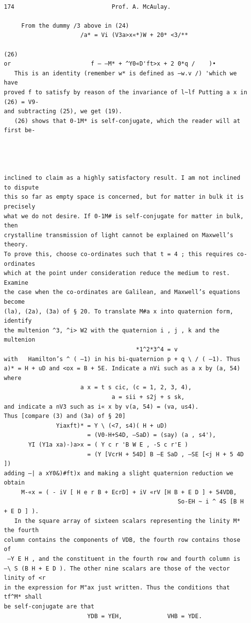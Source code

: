 \documentclass[10pt]{article}
\begin{document}
\clearpage
\begin{verbatim}

174                            Prof. A. McAulay.

     From the dummy /3 above in (24)
                      /a* = Vi (V3a>x«*)W + 20* <3/**
                                                                              (26)
or                       f — —M* + ^Y0«D'ft>x + 2 0*q /    )•
   This is an identity (remember w* is defined as —w.v /) 'which we have
proved f to satisfy by reason of the invariance of l~lf Putting a x in (26) = V9-
and subtracting (25), we get (19).
   (26) shows that 0-1M* is self-conjugate, which the reader will at first be-




inclined to claim as a highly satisfactory result. I am not inclined to dispute
this so far as empty space is concerned, but for matter in bulk it is precisely
what we do not desire. If 0-1M# is self-conjugate for matter in bulk, then
crystalline transmission of light cannot be explained on Maxwell’s theory.
To prove this, choose co-ordinates such that t = 4 ; this requires co-ordinates
which at the point under consideration reduce the medium to rest. Examine
the case when the co-ordinates are Galilean, and Maxwell’s equations become
(la), (2a), (3a) of § 20. To translate M#a x into quaternion form, identify
the multenion ^3, ^i> W2 with the quaternion i , j , k and the multenion
                                      *1^2*3^4 = v
with   Hamilton’s ^ ( —1) in his bi-quaternion p + q \ / ( —1). Thus
a)* = H + uD and <ox = B + 5E. Indicate a nVi such as a x by (a, 54) where
                      a x = t s cic, (c = 1, 2, 3, 4),
                               a = sii + s2j + s sk,
and indicate a nV3 such as i« x by v(a, 54) = (va, us4).
Thus [compare (3) and (3a) of § 20]
               Yiaxft)* = Y \ (<7, s4)( H + uD)
                        = (V0-H+S4D, —SaD) = (say) (a , s4'),
       YI (Y1a xa)-)a>x = ( Y c r 'B W E , -S c r'E )
                        = (Y [VcrH + 54D] B —E SaD , —SE [<j H + 5 4D ])
adding —| a xY0&)#ft)x and making a slight quaternion reduction we obtain
     M-«x = ( - iV [ H e r B + EcrD] + iV «rV [H B + E D ] + 54VDB,
                                                  So-EH ~ i ^ 4S [B H + E D ] ).
   In the square array of sixteen scalars representing the linity M* the fourth
column contains the components of VDB, the fourth row contains those of
 —Y E H , and the constituent in the fourth row and fourth column is
—\ S (B H + E D ). The other nine scalars are those of the vector linity of <r
in the expression for M"ax just written. Thus the conditions that tf^M* shall
be self-conjugate are that
                        YDB = YEH,             VHB = YDE.


\end{verbatim}
\end{document}
